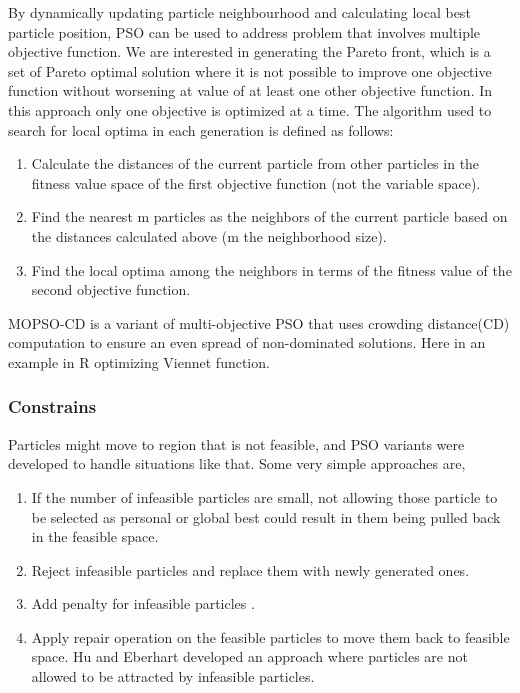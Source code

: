 \documentclass{article}
\begin{document}
By dynamically updating particle neighbourhood and calculating local best particle position, PSO can be used to address problem that involves multiple objective function. We are interested in generating the Pareto front, which is a set of Pareto optimal solution where it is not possible to improve one objective function without worsening at value of at least one other objective function. In this approach only one objective is optimized at a time. The algorithm used to search for local optima in each generation
is defined as follows:
\begin{enumerate}
    \item Calculate the distances of the current particle from other particles in the fitness value space of the first objective function (not the variable space).

    \item Find the nearest m particles as the neighbors of the current particle based on the distances calculated above (m the neighborhood size).

    \item Find the local optima among the neighbors in terms of the fitness value of the second objective function.
\end{enumerate}

MOPSO-CD is a variant of multi-objective PSO that uses crowding distance(CD) computation to ensure an even spread of non-dominated solutions. Here in an example in R optimizing Viennet function\cite{irfan_2021}.

\subsubsection{Constrains}
Particles might move to region that is not feasible, and PSO variants were developed to handle situations like that. Some very simple approaches are, 
\begin{enumerate}
    \item If the number of infeasible particles are small, not allowing those  particle to be selected as personal or global best could result in them being pulled back in the feasible space.
    \item Reject infeasible particles and replace them with newly generated ones.
    \item Add penalty for infeasible particles \cite{parsopoulos2002particle}. 
    \item Apply repair operation on the feasible particles to move them back to feasible space. Hu and Eberhart developed an approach where particles are not allowed to be attracted by infeasible particles. \cite{hu2002solving}
\end{enumerate}
\end{document}
